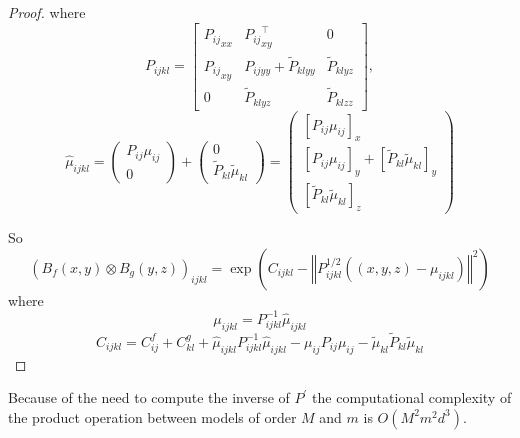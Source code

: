 \begin{proof}
    where
    \begin{equation}
    P_{ijkl} = \left[\begin{array}{ ccc }
    {P_{ij}}_{xx} & {P_{ij}}_{xy}^\top  & 0 \\
    {P_{ij}}_{xy} &P_{ijyy} + \tilde P_{klyy}  & \tilde P_{klyz} \\
    0 & \tilde P_{klyz} & \tilde P_{klzz}
    \end{array}\right],
\end{equation}
    \begin{equation}
    \hat\mu_{ijkl} = \begin{pmatrix}
    {P_{ij}}\mu_{ij}\\
    0\end{pmatrix} +
    \begin{pmatrix}
     0 \\
    {\tilde P_{kl}}\tilde\mu_{kl}
    \end{pmatrix} =
    \begin{pmatrix}
    [{P_{ij}}\mu_{ij}]_x\\
    [{P_{ij}}\mu_{ij}]_{y} + [{\tilde P_{kl}}\tilde\mu_{kl}]_{y}\\
    [{\tilde P_{kl}}\tilde\mu_{kl}]_{z}
     \end{pmatrix}
\end{equation}

So
\begin{equation}
    (B_f(x, y) \otimes B_g(y, z))_{ijkl} =  \exp\left(C_{ijkl}-\left\Vert P_{ijkl}^{1/2}\left((x, y, z) - \mu_{ijkl}\right)\right\Vert^2\right)
\end{equation}
where
\begin{equation}
    \mu_{ijkl} = P_{ijkl}^{-1}\hat\mu_{ijkl}
\end{equation}
\begin{equation}
    C_{ijkl} = C^f_{ij} + C^g_{kl} +\hat\mu_{ijkl}P_{ijkl}^{-1}\hat\mu_{ijkl} -  \mu_{ij}P_{ij}\mu_{ij} - \tilde\mu_{kl}\tilde P_{kl}\tilde\mu_{kl}
\end{equation}
\end{proof}
\begin{remark}
Because of the need to compute the inverse of $P^\prime$ the computational complexity of the product operation between models of order $M$ and $m$ is $O(M^2m^2d^3)$.
\end{remark}
